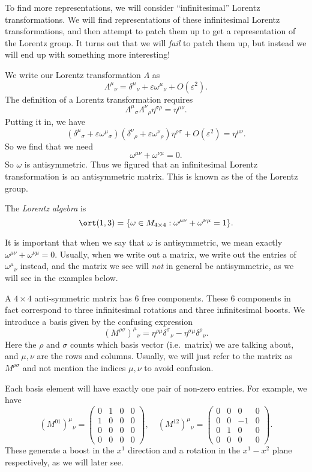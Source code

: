 \documentclass[a4paper]{article}
\begin{document}
To find more representations, we will consider ``infinitesimal'' Lorentz transformations. We will find representations of these infinitesimal Lorentz transformations, and then attempt to patch them up to get a representation of the Lorentz group. It turns out that we will \emph{fail} to patch them up, but instead we will end up with something more interesting!

We write our Lorentz transformation $\Lambda$ as
\[
  \Lambda^\mu\!_\nu = \delta^\mu\!_\nu + \varepsilon \omega^\mu\!_\nu + O(\varepsilon^2).
\]
The definition of a Lorentz transformation requires
\[
  \Lambda^\mu\!_\sigma \Lambda^\nu\!_\rho \eta^{\sigma \rho} = \eta^{\mu\nu}.
\]
Putting it in, we have
\[
  (\delta^\mu\!_\sigma + \varepsilon \omega^\mu\!_\sigma) (\delta^\nu\!_\rho + \varepsilon \omega^\nu\!_\rho) \eta^{\rho\sigma} + O(\varepsilon^2) = \eta^{\mu\nu}.
\]
So we find that we need
\[
  \omega^{\mu\nu} + \omega^{\nu\mu} = 0.
\]
So $\omega$ is antisymmetric. Thus we figured that an infinitesimal Lorentz transformation is an antisymmetric matrix. This is known as the  of the Lorentz group.
\begin{defi}
  The \emph{Lorentz algebra} is
  \[
    \ort(1, 3) = \{\omega \in M_{4 \times 4}: \omega^{\mu\nu} + \omega^{\nu\mu} = 1\}.
  \]
\end{defi}
It is important that when we say that $\omega$ is antisymmetric, we mean exactly $\omega^{\mu\nu} + \omega^{\nu\mu} = 0$. Usually, when we write out a matrix, we write out the entries of $\omega^\mu\!_\nu$ instead, and the matrix we see will \emph{not} in general be antisymmetric, as we will see in the examples below.

A $4 \times 4$ anti-symmetric matrix has $6$ free components. These $6$ components in fact correspond to three infinitesimal rotations and three infinitesimal boosts. We introduce a basis given by the confusing expression
\[
  (M^{\rho\sigma})^\mu\!_\nu = \eta^{\rho\mu}\delta^\sigma\!_\nu - \eta^{\sigma\mu}\delta^{\rho}\!_\nu.
\]
Here the $\rho$ and $\sigma$ counts which basis vector (i.e.\ matrix) we are talking about, and $\mu, \nu$ are the rows and columns. Usually, we will just refer to the matrix as $M^{\rho\sigma}$ and not mention the indices $\mu, \nu$ to avoid confusion.

Each basis element will have exactly one pair of non-zero entries. For example, we have
\[
  (M^{01})^\mu\!_\nu =
  \begin{pmatrix}
   0 & 1 & 0 & 0\\
   1 & 0 & 0 & 0\\
   0 & 0 & 0 & 0\\
   0 & 0 & 0 & 0
  \end{pmatrix},\quad
  (M^{12})^\mu\!_\nu =
  \begin{pmatrix}
    0 & 0 & 0 & 0\\
    0 & 0 & -1 & 0\\
    0 & 1 & 0 & 0\\
    0 & 0 & 0 & 0
  \end{pmatrix}.
\]
These generate a boost in the $x^1$ direction and a rotation in the $x^1-x^2$ plane respectively, as we will later see.
\end{document}
